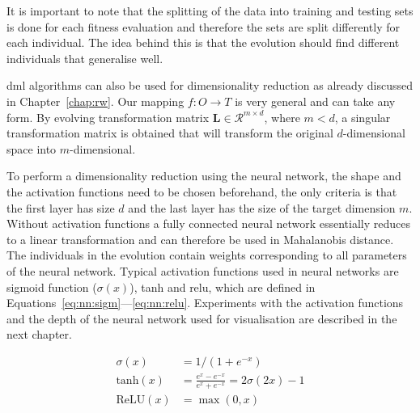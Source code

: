 It is important to note that the splitting of the data into training and testing sets is done for each fitness evaluation and therefore the sets are split differently for each individual. The idea behind this is that the evolution should find different individuals that generalise well.

\Ac{dml} algorithms can also be used for dimensionality reduction as already discussed in Chapter~\ref{chap:rw}. Our mapping $f: O \to T$ is very general and can take any form. By evolving transformation matrix $\bm{L} \in \mathcal{R}^{m\times d}$, where $m < d$, a singular transformation matrix is obtained that will transform the original $d$-dimensional space into $m$-dimensional.

To perform a dimensionality reduction using the neural network, the shape and the activation functions need to be chosen beforehand, the only criteria is that the first layer has size $d$ and the last layer has the size of the target dimension $m$. Without activation functions a fully connected neural network essentially reduces to a linear transformation and can therefore be used in Mahalanobis distance. The individuals in the evolution contain weights corresponding to all parameters of the neural network. Typical activation functions used in neural networks are sigmoid function ($\sigma(x)$), \ac{tanh} and \ac{relu}, which are defined in Equations~\ref{eq:nn:sigm}---\ref{eq:nn:relu}. Experiments with the activation functions and the depth of the neural network used for visualisation are described in the next chapter.

\begin{align}
\sigma(x)      &= 1/(1+e^{-x}) \label{eq:nn:sigm} \\
\text{tanh}(x) &= \frac{e^x-e^{-x}}{e^x+e^{-x}} = 2\sigma(2x)-1 \label{eq:nn:tanh} \\
\text{ReLU}(x) &= \max(0,x) \label{eq:nn:relu}
\end{align}

